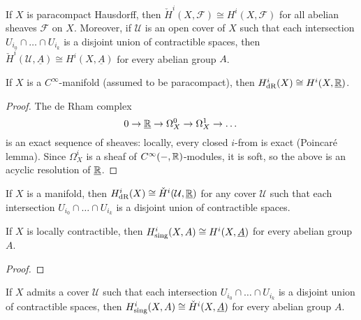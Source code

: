 \begin{prop}\label{prop:comparison-sheaf-cohomology-Čech-cohomology}
If \(X\) is paracompact Hausdorff, then \(\check{H}^i(X,\mathcal F)\cong H^i(X,\mathcal F)\) for all abelian sheaves \(\mathcal F\) on \(X\).
Moreover, if \(\mathcal U\) is an open cover of \(X\) such that each intersection \(U_{i_0}\cap\dots\cap U_{i_k}\) is a disjoint union of contractible spaces, then \(\check{H}^i(\mathcal U,\underline{A})\cong H^i(X,\underline{A})\) for every abelian group \(A\).
\end{prop}

\begin{prop}\label{prop:comparison-de-Rham-cohomology-sheaf-cohomology}
If \(X\) is a \(C^\infty\)-manifold (assumed to be paracompact), then \(H^i_{\smash{\textup{dR}}}(X)\cong H^i(X,\underline{\mathbb{R}})\).
\end{prop}
\begin{proof}
The de Rham complex
\[ 0\to\underline{\mathbb{R}}\to \Omega^0_X \to \Omega^1_X \to \dots \]
is an exact sequence of sheaves: locally, every closed \(i\)-from is exact (Poincaré lemma).
Since \(\Omega^i_X\) is a sheaf of \(C^\infty(-,\mathbb{R})\)-modules, it is soft, so the above is an acyclic resolution of \(\underline{\mathbb{R}}\).
\end{proof}

\begin{prop}\label{prop:comparison-de-Rham-cohomology-Čech-chomology}
If \(X\) is a manifold, then \(H^i_{\smash{\textup{dR}}}(X)\cong\check{H}^i(\mathcal U,\underline{\mathbb{R}})\) for any cover \(\mathcal U\) such that each intersection \(U_{i_0}\cap \dots\cap U_{i_k}\) is a disjoint union of contractible spaces.
\end{prop}

\begin{prop}\label{prop:comparison-singular-cohomology-sheaf-cohomology}
If \(X\) is locally contractible, then \(H^i_{\smash{\textup{sing}}}(X,A) \cong H^i(X,\underline{A})\) for every abelian group \(A\).
\end{prop}
\begin{proof}
\end{proof}

\begin{prop}\label{prop:comparison-singular-cohomology-Čech-cohomology}
If \(X\) admits a cover \(\mathcal U\) such that each intersection \(U_{i_0}\cap\dots\cap U_{i_k}\) is a disjoint union of contractible spaces, then \(H^i_{\smash{\textup{sing}}}(X,A)\cong\check{H}^i(X,\underline{A})\) for every abelian group \(A\).
\end{prop}

